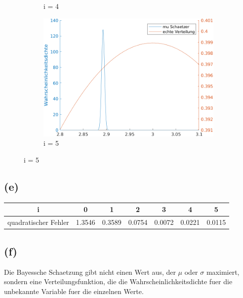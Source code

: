 \documentclass[a4paper]{scrartcl}
\begin{document}
\begin{figure}[H]
\begin{subfigure}{.5\textwidth}
		\caption*{i = 4}
	\end{subfigure}%
	\begin{subfigure}{.5\textwidth}
		\centering
		\includegraphics*[scale = 0.4]{assignment3_data/plots/q3_i5}
		\caption*{i = 5}
	\end{subfigure}
\end{figure}

\subsection*{(e)}
\begin{tabular}{|c|c|c|c|c|c|c|}
	\hline 
	i & 0 & 1 & 2 & 3 & 4 & 5 \\ 
	\hline 
	quadratischer Fehler & 1.3546 & 0.3589 & 0.0754 & 0.0072 & 0.0221 & 0.0115 \\ 
	\hline 
\end{tabular}

\subsection*{(f)}
Die Bayessche Schaetzung gibt nicht einen Wert aus, der $\mu$ oder $\sigma$ maximiert, sondern eine Verteilungsfunktion, die die Wahrscheinlichkeitsdichte fuer die unbekannte Variable fuer die einzelnen Werte. 
\end{document}
